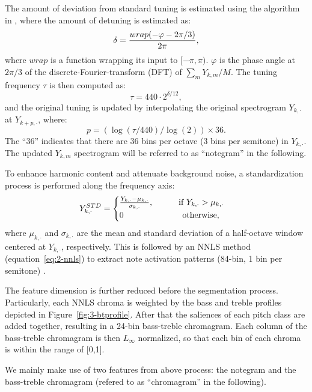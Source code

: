 The amount of deviation from standard tuning is estimated using the algorithm in \cite{dressler2007tuning}, where the amount of detuning is estimated as:
\begin{equation}\label{eq:3-tuning}
	\delta = { {wrap(-\varphi-{2\pi}/3)} \over {2\pi} },
\end{equation}
where $wrap$ is a function wrapping its input to $[-\pi,\pi)$. $\varphi$ is the phase angle at $2\pi/3$ of the discrete-Fourier-transform (DFT) of ${\sum_m Y_{k,m}} / M$. The tuning frequency $\tau$ is then computed as:
\begin{equation}
\tau=440\cdot2^{\delta/12},
\end{equation}
and the original tuning is updated by interpolating the original spectrogram $Y_{k,\cdot}$ at $Y_{{k+p},\cdot}$, where:
\begin{equation}
p = (\log(\tau / 440) / \log(2)) \times 36.
\end{equation}
The ``36'' indicates that there are 36 bins per octave (3 bins per semitone) in $Y_{k,\cdot}$. The updated $Y_{k,m}$ spectrogram will be referred to as ``notegram'' in the following.

To enhance harmonic content and attenuate background noise, a standardization process is performed along the frequency axis:
\begin{equation}
Y^{STD}_{k,\cdot} = 
\begin{cases}
{{Y_{k,\cdot} - \mu_{k,\cdot}} \over \sigma_{k,\cdot}}, \text{\quad\quad\quad if } Y_{k,\cdot} > \mu_{k,\cdot}\\
0 \quad\quad\quad\quad\quad\quad\quad\text{otherwise,}
\end{cases}
\end{equation}
where $\mu_{k,\cdot}$ and $\sigma_{k,\cdot}$ are the mean and standard deviation of a half-octave window centered at $Y_{k,\cdot}$, respectively. This is followed by an NNLS method  (equation~\ref{eq:2-nnls}) to extract note activation patterns (84-bin, 1 bin per semitone) \cite{mauch2010approximate}.

The feature dimension is further reduced before the segmentation process. Particularly, each NNLS chroma is weighted by the bass and treble profiles depicted in Figure~\ref{fig:3-btprofile}. After that the saliences of each pitch class are added together, resulting in a 24-bin bass-treble chromagram. Each column of the bass-treble chromagram is then $L_\infty$ normalized, so that each bin of each chroma is within the range of [0,1].

We mainly make use of two features from above process: the notegram and the bass-treble chromagram (refered to as ``chromagram'' in the following).

